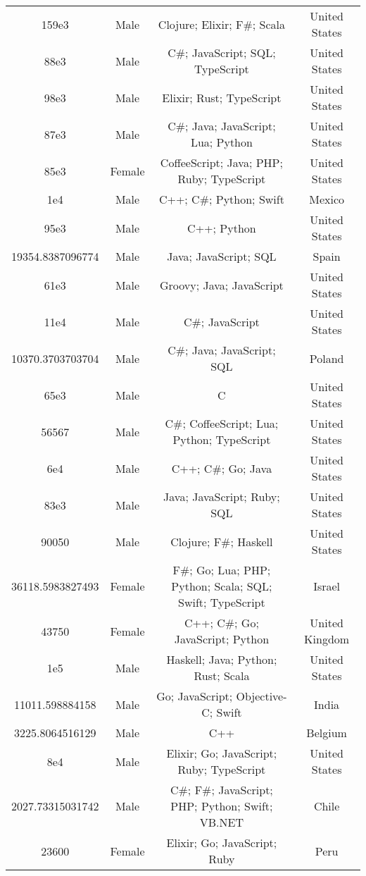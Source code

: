 \begin{center}
\begin{tabular}{ |c|c|c|c| }
159e3  &  Male  &  Clojure; Elixir; F\#; Scala  &  United States  \\ 
88e3  &  Male  &  C\#; JavaScript; SQL; TypeScript  &  United States  \\ 
98e3  &  Male  &  Elixir; Rust; TypeScript  &  United States  \\ 
87e3  &  Male  &  C\#; Java; JavaScript; Lua; Python  &  United States  \\ 
85e3  &  Female  &  CoffeeScript; Java; PHP; Ruby; TypeScript  &  United States  \\ 
1e4  &  Male  &  C++; C\#; Python; Swift  &  Mexico  \\ 
95e3  &  Male  &  C++; Python  &  United States  \\ 
19354.8387096774  &  Male  &  Java; JavaScript; SQL  &  Spain  \\ 
61e3  &  Male  &  Groovy; Java; JavaScript  &  United States  \\ 
11e4  &  Male  &  C\#; JavaScript  &  United States  \\ 
10370.3703703704  &  Male  &  C\#; Java; JavaScript; SQL  &  Poland  \\ 
65e3  &  Male  &  C  &  United States  \\ 
56567  &  Male  &  C\#; CoffeeScript; Lua; Python; TypeScript  &  United States  \\ 
6e4  &  Male  &  C++; C\#; Go; Java  &  United States  \\ 
83e3  &  Male  &  Java; JavaScript; Ruby; SQL  &  United States  \\ 
90050  &  Male  &  Clojure; F\#; Haskell  &  United States  \\ 
36118.5983827493  &  Female  &  F\#; Go; Lua; PHP; Python; Scala; SQL; Swift; TypeScript  &  Israel  \\ 
43750  &  Female  &  C++; C\#; Go; JavaScript; Python  &  United Kingdom  \\ 
1e5  &  Male  &  Haskell; Java; Python; Rust; Scala  &  United States  \\ 
11011.598884158  &  Male  &  Go; JavaScript; Objective-C; Swift  &  India  \\ 
3225.8064516129  &  Male  &  C++  &  Belgium  \\ 
8e4  &  Male  &  Elixir; Go; JavaScript; Ruby; TypeScript  &  United States  \\ 
2027.73315031742  &  Male  &  C\#; F\#; JavaScript; PHP; Python; Swift; VB.NET  &  Chile  \\ 
23600  &  Female  &  Elixir; Go; JavaScript; Ruby  &  Peru  \\ 

\end{tabular}
\end{center}
